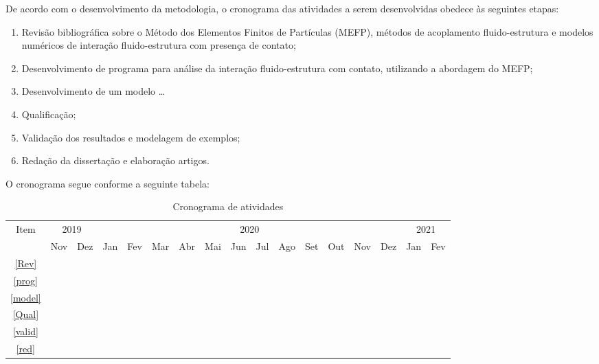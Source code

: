\documentclass[_ArquivoPrincipal.tex]{subfiles}
\begin{document}
De acordo com o desenvolvimento da metodologia, o cronograma das atividades a serem desenvolvidas obedece às seguintes etapas:
\begin{enumerate}[label=\Roman*.]
	\item\label{Rev} Revisão bibliográfica sobre o Método dos Elementos Finitos de Partículas (MEFP), métodos de acoplamento fluido-estrutura e modelos numéricos de interação fluido-estrutura com presença de contato;
	\item\label{prog} Desenvolvimento de programa para análise da interação fluido-estrutura com contato, utilizando a abordagem do MEFP;
	\item\label{model} Desenvolvimento de um modelo \dots
	\item\label{Qual} Qualificação;
	\item\label{valid} Validação dos resultados e modelagem de exemplos;
	\item\label{red} Redação da dissertação e elaboração artigos.	
\end{enumerate}

O cronograma segue conforme a seguinte tabela:
\begin{table}[H]
	\fontsize{10}{14}\selectfont
	\centering	
	
	\begin{tabular}{c|cc|cccccccccccc|cc}
		\hline
		   \multirow{2}{*}{Item} & \multicolumn{2}{c|}{2019} & \multicolumn{12}{c|}{2020} & \multicolumn{2}{c}{2021} \\ \cline{2-17}
		    & Nov & Dez & Jan & Fev & Mar & Abr & Mai & Jun & Jul & Ago & Set & Out & Nov & Dez & Jan & Fev \\ \hline
		 \ref{Rev} & \cellcolor{ativ} & \cellcolor{ativ} & \cellcolor{ativ} & \cellcolor{ativ}& \cellcolor{ativ} & \cellcolor{ativ} & \cellcolor{ativ} & \cellcolor{ativ} & \cellcolor{ativ} & \cellcolor{ativ} & \cellcolor{ativ} & \cellcolor{ativ} & & & & \\ \hline
		 \ref{prog} & \cellcolor{ativ} & \cellcolor{ativ} & \cellcolor{ativ} & \cellcolor{ativ} & & & & & & & & & & & & \\ \hline
		 \ref{model} & & & & & \cellcolor{ativ} & \cellcolor{ativ} & \cellcolor{ativ} & \cellcolor{ativ} & \cellcolor{ativ} & & & & & \\ \hline
		 \ref{Qual} & & & & & & & & & & \cellcolor{ativ} & & & & & & \\ \hline
		 \ref{valid} & & & & & & & & & & & \cellcolor{ativ} & \cellcolor{ativ} & \cellcolor{ativ} & \cellcolor{ativ} & \cellcolor{ativ} & \cellcolor{ativ} \\ \hline
		 \ref{red} & \cellcolor{ativ} & \cellcolor{ativ} & \cellcolor{ativ} & \cellcolor{ativ} & \cellcolor{ativ} & \cellcolor{ativ} & \cellcolor{ativ} & \cellcolor{ativ} & \cellcolor{ativ} & \cellcolor{ativ} & \cellcolor{ativ} & \cellcolor{ativ} & \cellcolor{ativ} & \cellcolor{ativ} & \cellcolor{ativ} & \cellcolor{ativ} \\ \hline
	\end{tabular}
	\caption{Cronograma de atividades}
\end{table}


	
\end{document}
